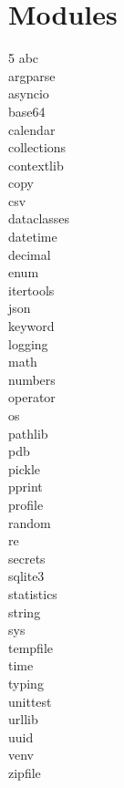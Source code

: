 \documentclass [8pt] {extarticle}
\begin{document}
    \section {Modules}

    \begin {multicols} {5}
    abc \\
    argparse \\
    asyncio \\
    base64 \\
    calendar \\
    collections \\
    contextlib \\
    copy \\
    csv \\
    dataclasses \\
    datetime \\
    decimal \\
    enum \\
    itertools \\
    json \\
    keyword \\
    logging \\
    math \\
    numbers \\
    operator \\
    os \\
    pathlib \\
    pdb \\
    pickle \\
    pprint \\
    profile \\
    random \\
    re \\
    secrets \\
    sqlite3 \\
    statistics \\
    string \\
    sys \\
    tempfile \\
    time \\
    typing \\
    unittest \\
    urllib \\
    uuid \\
    venv \\
    zipfile \\
    \end {multicols}
\end{document}
